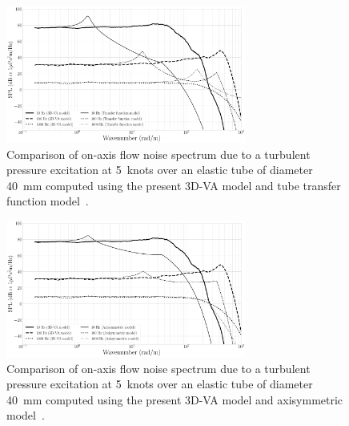 \documentclass[twocolumn,10pt]{asme2ej}
\begin{document}
\begin{figure}[h]
    \centering
    \includegraphics[width=3.1in]{figure/Inside pressure comparison 3d and approx.pdf}
    \caption{Comparison of on-axis flow noise spectrum due to a turbulent pressure excitation at 5~knots over an elastic tube of diameter 40~mm computed using the present 3D-VA model and tube transfer function model~\cite{knight1996}.} 
    \label{3d vs approx}
\end{figure}
\begin{figure}[h]
    \centering
    \includegraphics[width=3.1in]{figure/Inside pressure comparison 3d and axi.pdf}
    \caption{Comparison of on-axis flow noise spectrum due to a turbulent pressure excitation at 5~knots over an elastic tube of diameter 40~mm computed using the present 3D-VA model and axisymmetric model~\cite{jineesh2013}.}
    \label{3d vs axi}
\end{figure}
\end{document}
